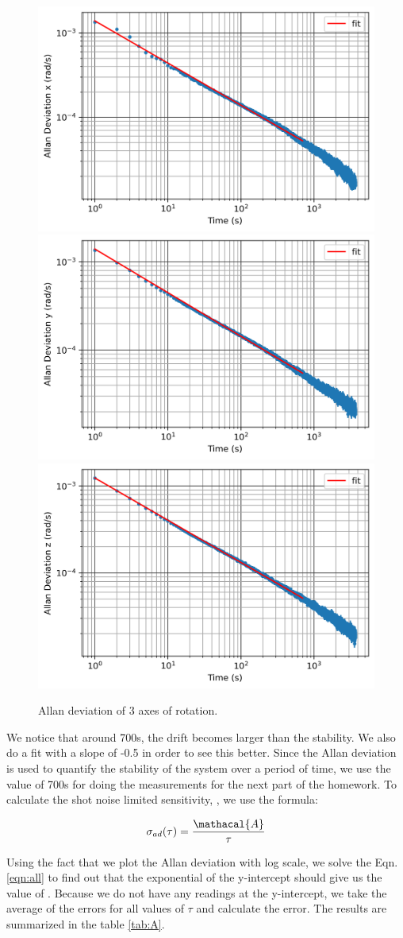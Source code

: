 \documentclass[a4paper]{article}
\begin{document}
\begin{figure}[hbt!]
     \centering
	 {{\includegraphics[width=0.4\columnwidth]{allan_x.png}}}
	 {{\includegraphics[width=0.4\columnwidth]{allan_y.png}}}
	 {{\includegraphics[width=0.4\columnwidth]{allan_z.png}}}
	 \caption{Allan deviation of 3 axes of rotation.}
	 \label{fig:fft}
\end{figure}

We notice that around 700s, the drift becomes larger than the stability. We also do a fit with a slope of -0.5 in order to see this better. Since the Allan deviation is used to quantify the stability of the system over a period of time, we use the value of 700s for doing the measurements for the next part of the homework. 
To calculate the shot noise limited sensitivity, , we use the formula: 

\begin{equation} \label{eqn:all}
		\sigma_{ad}(\tau) = \frac{\mathacal{A}}{\tau}
\end{equation}

Using the fact that we plot the Allan deviation with log scale, we solve the Eqn. \ref{eqn:all} to find out that the exponential of the y-intercept should give us the value of . Because we do not have any readings at the y-intercept, we take the average of the errors for all values of $\tau$ and calculate the error. The results are summarized in the table \ref{tab:A}.
\end{document}
